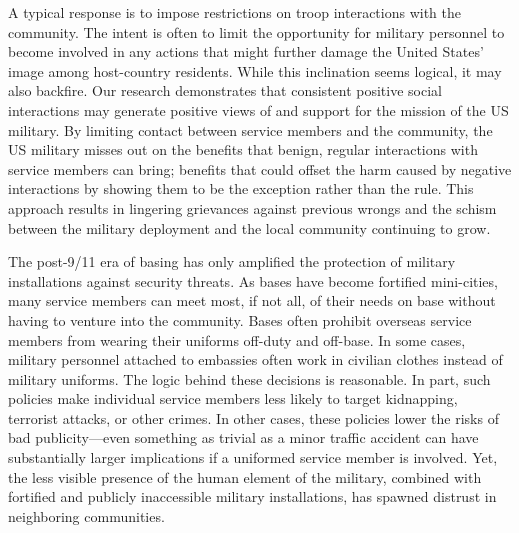 A typical response is to impose restrictions on troop interactions with the community. The intent is often to limit the opportunity for military personnel to become involved in any actions that might further damage the United States' image among host-country residents. While this inclination seems logical, it may also backfire. Our research demonstrates that consistent positive social interactions may generate positive views of and support for the mission of the US military.\autocite{Allen2020} By limiting contact between service members and the community, the US military misses out on the benefits that benign, regular interactions with service members can bring; benefits that could offset the harm caused by negative interactions by showing them to be the exception rather than the rule. This approach results in lingering grievances against previous wrongs and the schism between the military deployment and the local community continuing to grow.  

The post-9/11 era of basing has only amplified the protection of military installations against security threats. As bases have become fortified mini-cities, many service members can meet most, if not all, of their needs on base without having to venture into the community. Bases often prohibit overseas service members from wearing their uniforms off-duty and off-base. In some cases, military personnel attached to embassies often work in civilian clothes instead of military uniforms. The logic behind these decisions is reasonable. In part, such policies make individual service members less likely to target kidnapping, terrorist attacks, or other crimes. In other cases, these policies lower the risks of bad publicity---even something as trivial as a minor traffic accident can have substantially larger implications if a uniformed service member is involved.  Yet, the less visible presence of the human element of the military, combined with fortified and publicly inaccessible military installations, has spawned distrust in neighboring communities. 

